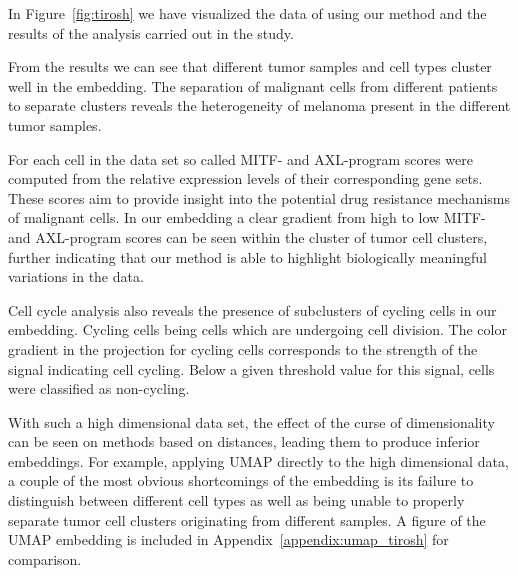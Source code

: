In Figure~\ref{fig:tirosh} we have visualized the data of \cite{tirosh} using our method and the results of the analysis carried out in the study.

From the results we can see that different tumor samples and cell types cluster well in the embedding. The separation of malignant cells from different patients to separate clusters reveals the heterogeneity of melanoma present in the different tumor samples.

For each cell in the data set so called MITF- and AXL-program scores were computed from the relative expression levels of their corresponding gene sets. These scores aim to provide insight into the potential drug resistance mechanisms of malignant cells. In our embedding a clear gradient from high to low MITF- and AXL-program scores can be seen within the cluster of tumor cell clusters, further indicating that our method is able to highlight biologically meaningful variations in the data.

Cell cycle analysis also reveals the presence of subclusters of cycling cells in our embedding. Cycling cells being cells which are undergoing cell division. The color gradient in the projection for cycling cells corresponds to the strength of the signal indicating cell cycling. Below a given threshold value for this signal, cells were classified as non-cycling.

With such a high dimensional data set, the effect of the curse of dimensionality can be seen on methods based on distances, leading them to produce inferior embeddings. For example, applying UMAP directly to the high dimensional data, a couple of the most obvious shortcomings of the embedding is its failure to distinguish between different cell types as well as being unable to properly separate tumor cell clusters originating from different samples. A figure of the UMAP embedding is included in Appendix~\ref{appendix:umap_tirosh} for comparison.


